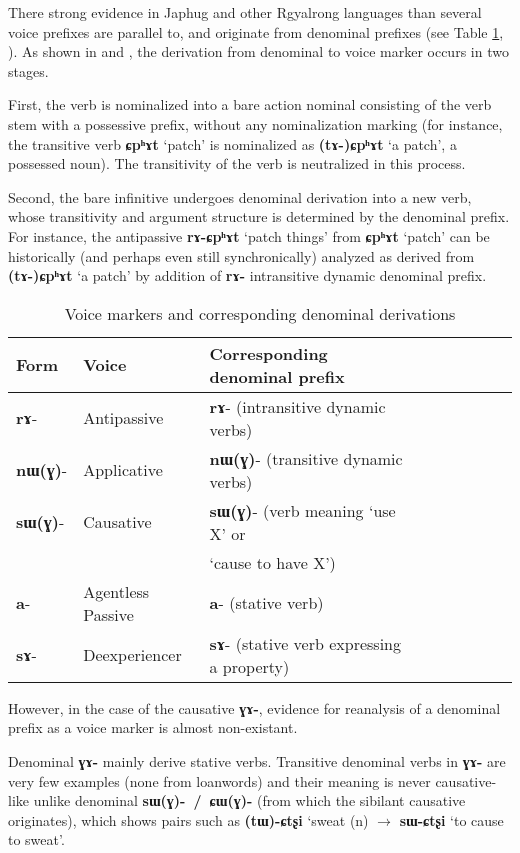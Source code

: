 \documentclass[oneside,a4paper,11pt]{article}
\newcommand{\ipa}[1]{\textbf{{\phon\mbox{#1}}}} %
\begin{document}
There strong evidence in Japhug and other Rgyalrong languages than several voice prefixes are parallel to, and originate from denominal prefixes (see Table \ref{tab:denom}, \citealt{jacques14antipassive}). As shown in \citet{jacques14antipassive} and \citet{jacques15causative}, the derivation from denominal to voice marker occurs in two stages.

First, the verb is nominalized into a bare action nominal consisting of the verb stem with a possessive prefix, without any nominalization marking (for instance, the transitive verb \ipa{ɕpʰɤt} `patch' is nominalized as \ipa{(tɤ-)ɕpʰɤt} `a patch', a possessed noun). The transitivity of the verb is neutralized in this process. 

Second, the bare infinitive undergoes denominal derivation into a new verb, whose transitivity and argument structure is determined by the denominal prefix. For instance, the antipassive \ipa{rɤ-ɕpʰɤt} `patch things' from  \ipa{ɕpʰɤt} `patch' can be historically (and perhaps even still synchronically) analyzed as  derived from \ipa{(tɤ-)ɕpʰɤt} `a patch' by addition of \ipa{rɤ-} intransitive dynamic denominal prefix. 

\begin{table}[H] \caption{Voice markers and corresponding denominal derivations} \label{tab:denom} \centering
\begin{tabular}{lllllllll} \toprule
Form& Voice & Corresponding denominal prefix \\
\midrule
\ipa{rɤ}- & Antipassive &    \ipa{rɤ}- (intransitive dynamic verbs)\\
\ipa{nɯ(ɣ)}- & Applicative &    \ipa{nɯ(ɣ)}- (transitive dynamic verbs)\\
\ipa{sɯ(ɣ)}- & Causative &    \ipa{sɯ(ɣ)}- (verb meaning `use X' or \\
&& `cause to have X') \\
\ipa{a}- & Agentless Passive &    \ipa{a}- (stative verb)\\
\ipa{sɤ}-  & Deexperiencer &    \ipa{sɤ}- (stative verb expressing a property)\\
    \bottomrule
\end{tabular}
\end{table}

However, in the case of the causative \ipa{ɣɤ-}, evidence for reanalysis of a denominal prefix as a voice marker is almost non-existant.

Denominal \ipa{ɣɤ-} mainly derive stative verbs. Transitive denominal verbs in \ipa{ɣɤ-} are very few examples (none from loanwords) and their meaning is never causative-like unlike denominal \ipa{sɯ(ɣ)- / ɕɯ(ɣ)-} (from which the sibilant causative originates), which shows pairs such as \ipa{(tɯ)-ɕtʂi} `sweat (n) $\rightarrow$ \ipa{sɯ-ɕtʂi} `to cause to sweat'. 
\end{document}
